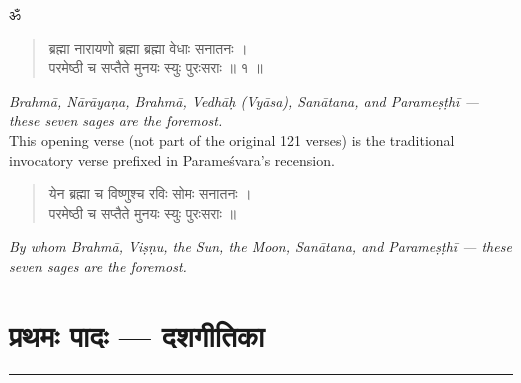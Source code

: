 \documentclass[11pt,a4paper]{article}
\newcommand{\dev}[1]{{\devanagarifont #1}}
\newenvironment{sanskritverse}{\begin{verse}\devanagarifont\large\centering}{\end{verse}}
\begin{document}
\begin{center}
\dev{\Large ॐ}
\end{center}

\vspace{0.5cm}

\begin{tcolorbox}[colback=white,colframe=rulecolor,title={\dev{\textbf{मङ्गलाचरण — सप्तऋषयः}}}]
\begin{sanskritverse}
\dev{ब्रह्मा नारायणो ब्रह्मा ब्रह्मा वेधाः सनातनः ।\\
परमेष्ठी च सप्तैते मुनयः स्युः पुरःसराः ॥ १ ॥}
\end{sanskritverse}
\end{tcolorbox}

\vspace{0.3cm}
\noindent\textit{Brahmā, Nārāyaṇa, Brahmā, Vedhāḥ (Vyāsa), Sanātana, and Parameṣṭhī --- these seven sages are the foremost.}\\[0.5em]
\small This opening verse (not part of the original 121 verses) is the traditional invocatory verse prefixed in Parameśvara's recension.

\vspace{0.5cm}

\begin{tcolorbox}[colback=white,colframe=rulecolor]
\begin{sanskritverse}
\dev{येन ब्रह्मा च विष्णुश्च रविः सोमः सनातनः ।\\
परमेष्ठी च सप्तैते मुनयः स्युः पुरःसराः ॥}
\end{sanskritverse}
\end{tcolorbox}

\vspace{0.3cm}
\noindent\textit{By whom Brahmā, Viṣṇu, the Sun, the Moon, Sanātana, and Parameṣṭhī --- these seven sages are the foremost.}

\clearpage

\section*{\dev{प्रथमः पादः — दशगीतिका}}

\begin{center}
\textcolor{rulecolor}{\rule{0.8\textwidth}{0.6pt}}
\end{center}
\end{document}
